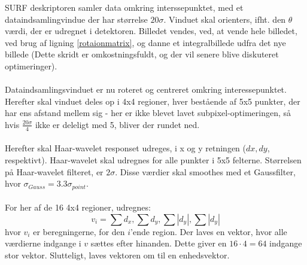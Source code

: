 SURF deskriptoren samler data omkring interssepunktet, med et dataindsamlingvindue der har størrelse $20 \sigma$. Vinduet skal orienters, ifht. den $\theta$ værdi, der er udregnet i detektoren. Billedet vendes, ved, at vende hele billedet, ved brug af ligning \eqref{rotaionmatrix}, og danne et integralbillede udfra det nye billede (Dette skridt er omkostningsfuldt, og der vil senere blive diskuteret optimeringer).
\\
\\
Dataindsamlingsvinduet er nu roteret og centreret omkring interessepunktet. Herefter skal vinduet deles op i 4x4 regioner, hver bestående af 5x5 punkter, der har ens afstand mellem sig - her er ikke blevet lavet subpixel-optimeringen, så hvis $\frac{20\sigma}{4}$ ikke er deleligt med 5, bliver der rundet ned.
\\
\\
Herefter skal Haar-wavelet responset udreges, i x og y retningen ($dx, dy$, respektivt). Haar-wavelet skal udregnes for alle punkter i 5x5 felterne. Størrelsen på Haar-wavelet filteret, er $2\sigma$. Disse værdier skal smoothes med et Gaussfilter, hvor $\sigma_{Gauss} = 3.3\sigma_{point}$.
\\
\\
For her af de 16 4x4 regioner, udregnes: 
\begin{equation}
v_i = \sum d_x, \sum d_y, \sum |d_y|, \sum |d_y|
\label{surffeature}
\end{equation}
hvor $v_i$ er beregningerne, for den $i$'ende region. Der laves en vektor, hvor alle værdierne indgange i $v$ sættes efter hinanden. Dette giver en $16 \cdot 4 = 64$ indgange stor vektor. Slutteligt, laves vektoren om til en enhedsvektor.

